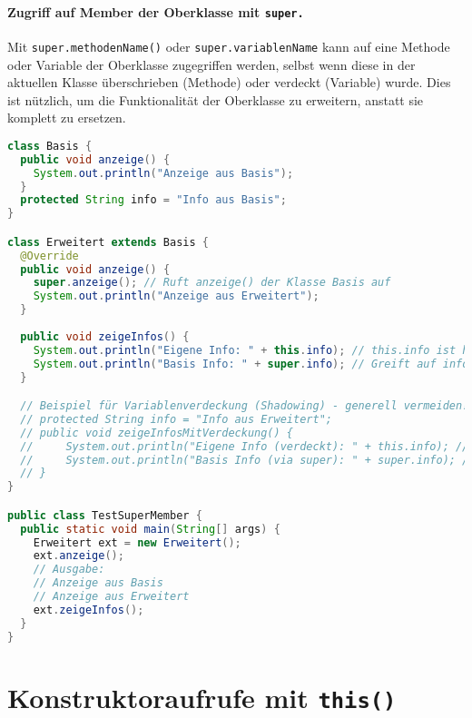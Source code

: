 \paragraph{Zugriff auf Member der Oberklasse mit \texttt{super.}}
Mit \texttt{super.methodenName()} oder \texttt{super.variablenName} kann auf eine Methode oder Variable der Oberklasse zugegriffen werden,
selbst wenn diese in der aktuellen Klasse überschrieben (Methode) oder verdeckt (Variable) wurde. Dies ist nützlich, um die Funktionalität
der Oberklasse zu erweitern, anstatt sie komplett zu ersetzen.

\begin{lstlisting}[language=Java, caption={Zugriff auf überschriebene Methode der Oberklasse via \texttt{super.}}]
class Basis {
  public void anzeige() {
    System.out.println("Anzeige aus Basis");
  }
  protected String info = "Info aus Basis";
}

class Erweitert extends Basis {
  @Override
  public void anzeige() {
    super.anzeige(); // Ruft anzeige() der Klasse Basis auf
    System.out.println("Anzeige aus Erweitert");
  }
    
  public void zeigeInfos() {
    System.out.println("Eigene Info: " + this.info); // this.info ist hier redundant, da info nicht neu deklariert wurde
    System.out.println("Basis Info: " + super.info); // Greift auf info der Basisklasse zu
  }

  // Beispiel für Variablenverdeckung (Shadowing) - generell vermeiden!
  // protected String info = "Info aus Erweitert"; 
  // public void zeigeInfosMitVerdeckung() {
  //     System.out.println("Eigene Info (verdeckt): " + this.info); // Info aus Erweitert
  //     System.out.println("Basis Info (via super): " + super.info); // Info aus Basis
  // }
}

public class TestSuperMember {
  public static void main(String[] args) {
    Erweitert ext = new Erweitert();
    ext.anzeige();
    // Ausgabe:
    // Anzeige aus Basis
    // Anzeige aus Erweitert
    ext.zeigeInfos();
  }
}
\end{lstlisting}

\section{Konstruktoraufrufe mit \texttt{this()}}
\label{sec:this_konstruktor}

